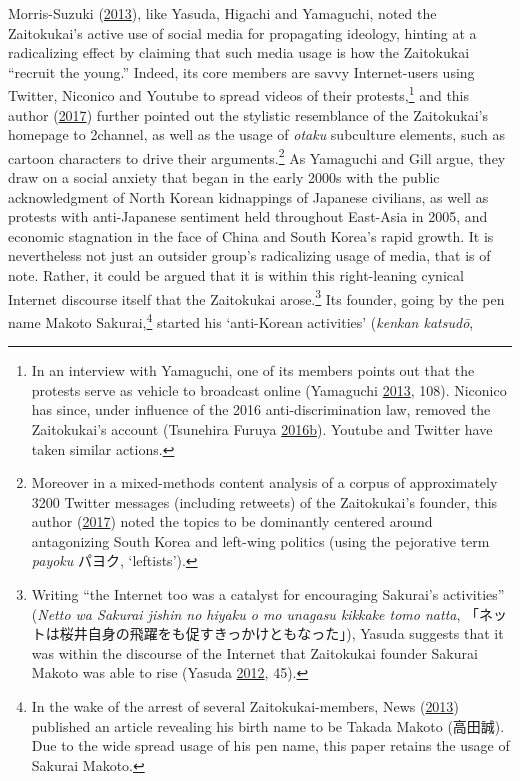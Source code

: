 \documentclass[10pt,british,A4paper,twoside]{memoir}
\begin{document}
Morris-Suzuki
(\protect\hyperlink{ref-morris-suzuki_freedom_2013}{2013}), like Yasuda,
Higachi and Yamaguchi, noted the Zaitokukai's active use of social media
for propagating ideology, hinting at a radicalizing effect by claiming
that such media usage is how the Zaitokukai ``recruit the young.''
Indeed, its core members are savvy Internet-users using Twitter,
Niconico and Youtube to spread videos of their protests,\footnote{In an
  interview with Yamaguchi, one of its members points out that the
  protests serve as vehicle to broadcast online (Yamaguchi
  \protect\hyperlink{ref-yamaguchi_xenophobia_2013}{2013}, 108).
  Niconico has since, under influence of the 2016 anti-discrimination
  law, removed the Zaitokukai's account (Tsunehira Furuya
  \protect\hyperlink{ref-furuya_can_2016}{2016}\protect\hyperlink{ref-furuya_can_2016}{b}).
  Youtube and Twitter have taken similar actions.} and this author
(\protect\hyperlink{ref-poppe_digitaal_2017}{2017}) further pointed out
the stylistic resemblance of the Zaitokukai's homepage to 2channel, as
well as the usage of \emph{otaku} subculture elements, such as cartoon
characters to drive their arguments.\footnote{Moreover in a
  mixed-methods content analysis of a corpus of approximately 3200
  Twitter messages (including retweets) of the Zaitokukai's founder,
  this author (\protect\hyperlink{ref-poppe_digitaal_2017}{2017}) noted
  the topics to be dominantly centered around antagonizing South Korea
  and left-wing politics (using the pejorative term \emph{payoku}
  パヨク, `leftists').} As Yamaguchi and Gill argue, they draw on a
social anxiety that began in the early 2000s with the public
acknowledgment of North Korean kidnappings of Japanese civilians, as
well as protests with anti-Japanese sentiment held throughout East-Asia
in 2005, and economic stagnation in the face of China and South Korea's
rapid growth. It is nevertheless not just an outsider group's
radicalizing usage of media, that is of note. Rather, it could be argued
that it is within this right-leaning cynical Internet discourse itself
that the Zaitokukai arose.\footnote{Writing ``the Internet too was a
  catalyst for encouraging Sakurai's activities'' (\emph{Netto wa
  Sakurai jishin no hiyaku o mo unagasu kikkake tomo natta},
  「ネットは桜井自身の飛躍をも促すきっかけともなった」), Yasuda suggests
  that it was within the discourse of the Internet that Zaitokukai
  founder Sakurai Makoto was able to rise (Yasuda
  \protect\hyperlink{ref-yasuda_eng:_2012}{2012}, 45).} Its founder,
going by the pen name Makoto Sakurai,\footnote{In the wake of the arrest
  of several Zaitokukai-members, News
  (\protect\hyperlink{ref-nikkei_news__2013}{2013}) published an article
  revealing his birth name to be Takada Makoto (高田誠). Due to the wide
  spread usage of his pen name, this paper retains the usage of Sakurai
  Makoto.} started his `anti-Korean activities' (\emph{kenkan katsudō},
\end{document}
